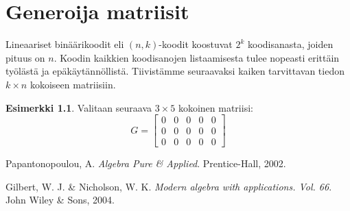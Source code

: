 \documentclass[a4paper,12pt,leqno,oneside]{report} %
\theoremstyle{plain}
\theoremstyle{definition}
\newtheorem{esimerkki}{Esimerkki}[chapter]
\theoremstyle{remark}
\numberwithin{equation}{chapter}
\begin{document}
    \chapter{Generoija matriisit}
    Lineaariset binäärikoodit eli $(n,k)$-koodit koostuvat $2^k$ koodisanasta, joiden pituus on $n$. Koodin kaikkien koodisanojen listaamisesta tulee nopeasti erittäin työlästä ja epäkäytännöllistä. Tiivistämme seuraavaksi kaiken tarvittavan tiedon $k \times n$ kokoiseen matriisiin.
    \begin{esimerkki}
        Valitaan seuraava $3 \times 5$ kokoinen matriisi:
        \[
            G=
            \begin{bmatrix}
                0 & 0 & 0 & 0 & 0 \\
                0 & 0 & 0 & 0 & 0 \\
                0 & 0 & 0 & 0 & 0
            \end{bmatrix}
        \]
    \end{esimerkki}

    \begin{thebibliography}{9}


        Papantonopoulou, A.
        \emph{Algebra Pure \& Applied}.
        Prentice-Hall, 2002.

        Gilbert, W. J. \& Nicholson, W. K.
        \emph{Modern algebra with applications. Vol. 66}.
        John Wiley \& Sons, 2004.

\end{thebibliography}
\end{document}
